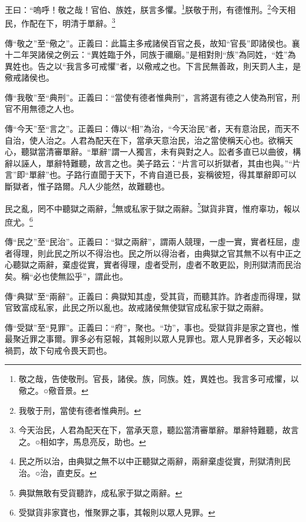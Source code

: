 王曰：“嗚呼！敬之哉！官伯、族姓，朕言多懼。\footnote{敬之哉，告使敬刑。官長，諸侯。族，同族。姓，異姓也。我言多可戒懼，以儆之。○儆音景。}朕敬于刑，有德惟刑。\footnote{我敬于刑，當使有德者惟典刑。}今天相民，作配在下，明清于單辭。\footnote{今天治民，人君為配天在下，當承天意，聽訟當清審單辭。單辭特難聽，故言之。○相如字，馬息亮反，助也。}


{\noindent\zhuan{}\fzbyks 傳“敬之”至“儆之”。正義曰：此篇主多戒諸侯百官之長，故知“官長”即諸侯也。襄十二年哭諸侯之例云：“異姓臨于外，同族于禰廟。”是相對則“族”為同姓，“姓”為異姓也。告之以“我言多可戒懼”者，以儆戒之也。下言民無善政，則天罰人主，是儆戒諸侯也。 \par}

{\noindent\zhuan{}\fzbyks 傳“我敬”至“典刑”。正義曰：“當使有德者惟典刑”，言將選有德之人使為刑官，刑官不用無德之人也。 \par}

{\noindent\zhuan{}\fzbyks 傳“今天”至“言之”。正義曰：傳以“相”為治，“今天治民”者，天有意治民，而天不自治，使人治之。人君為配天在下，當承天意治民，治之當使稱天心也。欲稱天心，聽獄當清審單辭。“單辭”謂一人獨言，未有與對之人。訟者多直已以曲彼，構辭以誣人，單辭特難聽，故言之也。美子路云：“片言可以折獄者，其由也與。”“片言”即“單辭”也。子路行直聞于天下，不肯自道已長，妄稱彼短，得其單辭即可以斷獄者，惟子路爾。凡人少能然，故難聽也。 \par}

民之亂，罔不中聽獄之兩辭，\footnote{民之所以治，由典獄之無不以中正聽獄之兩辭，兩辭棄虛從實，刑獄清則民治。○治，直吏反。}無或私家于獄之兩辭。\footnote{典獄無敢有受貨聽詐，成私家于獄之兩辭。}獄貨非寶，惟府辜功，報以庶尤。\footnote{受獄貨非家寶也，惟聚罪之事，其報則以眾人見罪。}


{\noindent\zhuan{}\fzbyks 傳“民之”至“民治”。正義曰：“獄之兩辭”，謂兩人競理，一虛一實，實者枉屈，虛者得理，則此民之所以不得治也。民之所以得治者，由典獄之官其無不以有中正之心聽獄之兩辭，棄虛從實，實者得理，虛者受刑，虛者不敢更訟，則刑獄清而民治矣。稱“必也使無訟乎”，謂此也。 \par}

{\noindent\zhuan{}\fzbyks 傳“典獄”至“兩辭”。正義曰：典獄知其虛，受其貨，而聽其詐。詐者虛而得理，獄官致富成私家，此民之所以亂也。故戒諸侯無使獄官成私家于獄之兩辭。 \par}

{\noindent\zhuan{}\fzbyks 傳“受獄”至“見罪”。正義曰：“府”，聚也。“功”，事也。受獄貨非是家之寶也，惟最聚近罪之事爾。罪多必有惡報，其報則以眾人見罪也。眾人見罪者多，天必報以禍罰，故下句戒令畏天罰也。 \par}

